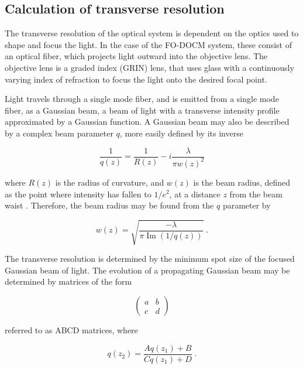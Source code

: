 \subsection{Calculation of transverse resolution}
\label{sec:transverse_background}

The transverse resolution of the optical system is dependent on the optics used to shape and focus the light. In the case of the FO-DOCM system, these consist of an optical fiber, which projects light outward into the objective lens. The objective lens is a graded index (GRIN) lens, that uses glass with a continuously varying index of refraction to focus the light onto the desired focal point.

Light travels through a single mode fiber, and is emitted from a single mode fiber, as a Gaussian beam, a beam of light with a transverse intensity profile approximated by a Gaussian function. A Gaussian beam may also be described by a complex beam parameter $q$, more easily defined by its inverse

\begin{equation}
 \frac{1}{q(z)} = \frac{1}{R(z)} - i \frac{\lambda}{\pi w(z)^2}
 \label{eq:qparam}
 \end{equation}

\noindent where $R(z)$ is the radius of curvature, and $w(z)$ is the beam radius, defined as the point where intensity has fallen to $1/e^2$, at a distance $z$ from the beam waist \cite{Siegman}. Therefore, the beam radius may be found from the $q$ parameter by

\begin{equation}
 w(z) = \sqrt{\frac{-\lambda}{\pi \operatorname{Im} (1/q(z))}} \; .
 \label{eq:wz}
 \end{equation}

The transverse resolution is determined by the minimum spot size of the focused Gaussian beam of light. The evolution of a propagating Gaussian beam may be determined by matrices of the form

\begin{equation}
 \left( \begin{array}{cc}
a & b \\
c & d \end{array} \right)
\end{equation}

\noindent referred to as ABCD matrices, where

\begin{equation}
 q(z_2) = \frac{A q(z_1) + B}{C q(z_1) + D} \; .
 \label{eq:abcd_q}
 \end{equation}

